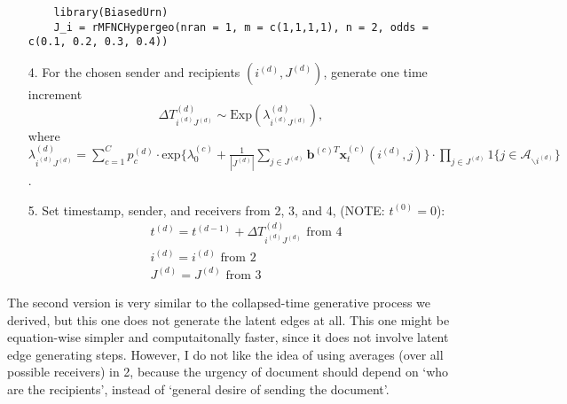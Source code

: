 \documentclass[a4paper]{article}
\begin{document}
\begin{itemize}
	\begin{verbatim}
	library(BiasedUrn)
	J_i = rMFNCHypergeo(nran = 1, m = c(1,1,1,1), n = 2, odds = c(0.1, 0.2, 0.3, 0.4))
	\end{verbatim}
	\item[4.] For the chosen sender and recipients $(i^{(d)}, J^{(d)})$, generate one time increment \begin{equation}
	\Delta T^{(d)}_{i^{(d)}J^{(d)}} \sim \mbox{Exp}(\lambda^{(d)}_{i^{(d)}J^{(d)}}),
	\end{equation}
	where $\lambda^{(d)}_{i^{(d)}J^{(d)}}= \sum\limits_{c=1}^{C} p^{(d)}_c\cdot\mbox{exp}\Big\{\lambda^{(c)}_0+\frac{1}{|J^{(d)}|}\sum\limits_{j \in J^{(d)}} \boldsymbol{b}^{(c)T}\boldsymbol{x}^{(c)}_t(i^{(d)}, j)\Big\}\cdot \prod\limits_{j \in J^{(d)}}1\{j \in \mathcal{A}_{\backslash i^{(d)}}\}$.
	\item[5.] Set timestamp, sender, and receivers from 2, 3, and 4,  (NOTE: $t^{(0)}=0$):
	\begin{equation}
	\begin{aligned}
	&t^{(d)} = t^{(d-1)}+\Delta T^{(d)}_{i^{(d)}J^{(d)}} \mbox{ from 4}\\
	&i^{(d)} = i^{(d)} \mbox{ from 2} \\
	&J^{(d)} = J^{(d)} \mbox{ from 3} 
	\end{aligned}
	\end{equation}
\end{itemize}
The second version is very similar to the collapsed-time generative process we derived, but this one does not generate the latent edges at all.
This one might be equation-wise simpler and computaitonally faster, since it does not involve latent edge generating steps. However, I do not like the idea of using averages (over all possible receivers) in 2, because the urgency of document should depend on `who are the recipients', instead of `general desire of sending the document'.
\end{document}
